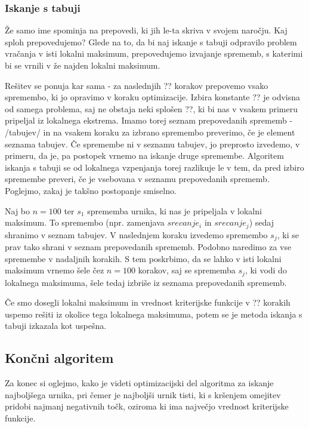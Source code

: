 \documentclass[a4paper, 10pt]{article}
\begin{document}
\subsubsection{Iskanje s tabuji}

Že samo ime spominja na prepovedi, ki jih le-ta skriva v svojem naročju. Kaj sploh prepovedujemo?
Glede na to, da bi naj iskanje s tabuji odpravilo problem vračanja v isti lokalni maksimum,
prepovedujemo izvajanje sprememb, s katerimi bi se vrnili v že najden lokalni maksimum.

Rešitev se ponuja kar sama - za naslednjih ?? korakov prepovemo vsako spremembo, ki jo
opravimo v koraku optimizacije. Izbira konstante ?? je odvisna od samega problema, saj
ne obstaja neki splošen ??, ki bi nas v vsakem primeru pripeljal iz lokalnega ekstrema.
Imamo torej seznam prepovedanih sprememb - /tabujev/ in na vsakem koraku za izbrano
spremembo preverimo, če je element seznama tabujev. Če spremembe ni v seznamu tabujev, jo
preprosto izvedemo, v primeru, da je, pa postopek vrnemo na iskanje druge spremembe.
Algoritem iskanja s tabuji se od lokalnega vzpenjanja torej razlikuje le v tem, da pred
izbiro spremembe preveri, če je vsebovana v seznamu prepovedanih sprememb. Poglejmo, zakaj
je takšno postopanje smiselno.

Naj bo $n=100$ ter $s_1$ sprememba urnika, ki nas je pripeljala v lokalni maksimum. To
spremembo (npr. zamenjava $ srecanje_i $ in $ srecanje_j $) sedaj shranimo v
seznam tabujev. V naslednjem koraku izvedemo spremembo $s_j$, ki se prav tako shrani v
seznam prepovedanih sprememb. Podobno naredimo za vse spremembe v nadaljnih korakih. S
tem poskrbimo, da se lahko v isti lokalni maksimum vrnemo šele čez $n = 100$ korakov, saj
se sprememba $s_j$, ki vodi do lokalnega maksimuma, šele tedaj izbriše iz seznama
prepovedanih sprememb.

Če smo dosegli lokalni maksimum in vrednost kriterijske funkcije v ?? korakih uspemo
rešiti iz okolice tega lokalnega maksimuma, potem se je metoda iskanja s tabuji izkazala
kot uspešna.

\subsection{Končni algoritem}

Za konec si oglejmo, kako je videti optimizacijski del algoritma za iskanje najboljšega
urnika, pri čemer je najboljši urnik tisti, ki s kršenjem omejitev pridobi najmanj negativnih
točk, oziroma ki ima največjo vrednost kriterijske funkcije.
\end{document}

